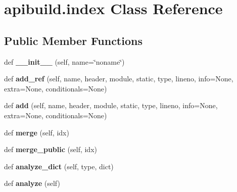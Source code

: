 \hypertarget{classapibuild_1_1index}{}\section{apibuild.\+index Class Reference}
\label{classapibuild_1_1index}
\subsection*{Public Member Functions}
\begin{DoxyCompactItemize}
\item 
\mbox{\label{classapibuild_1_1index_a9f1bc6ba4d754e9eea83d4381ae9a93f}} 
def {\bfseries \+\_\+\+\_\+init\+\_\+\+\_\+} (self, name=\char`\"{}noname\char`\"{})
\item 
\mbox{\label{classapibuild_1_1index_a1f9659fba66f090c31a001841254cf25}} 
def {\bfseries add\+\_\+ref} (self, name, header, module, static, type, lineno, info=None, extra=None, conditionals=None)
\item 
\mbox{\label{classapibuild_1_1index_a29765650c8069eb58000c83ec6b9a7b6}} 
def {\bfseries add} (self, name, header, module, static, type, lineno, info=None, extra=None, conditionals=None)
\item 
\mbox{\label{classapibuild_1_1index_aec67867164892eb9d798288833184489}} 
def {\bfseries merge} (self, idx)
\item 
\mbox{\label{classapibuild_1_1index_ab3e4ea20443937320133c7614fdc321d}} 
def {\bfseries merge\+\_\+public} (self, idx)
\item 
\mbox{\label{classapibuild_1_1index_a69fcafa93e24ef55a42bfc9d26cd48b5}} 
def {\bfseries analyze\+\_\+dict} (self, type, dict)
\item 
\mbox{\label{classapibuild_1_1index_aed331b94cd81ca14ea2d13d84e26fc2e}} 
def {\bfseries analyze} (self)
\end{DoxyCompactItemize}
